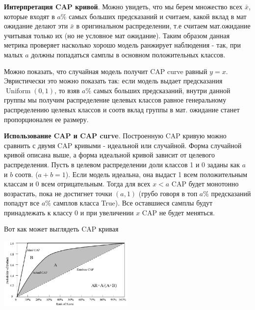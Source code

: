 \documentclass{article}
\begin{document}
    \quad 

    \textbf{Интерпретация CAP кривой}. Можно увидеть, что мы берем множество всех 
    $\bar{x}$, которые входят в $a\%$ самых больших предсказаний
    и считаем, какой вклад в мат ожидание делают эти $\bar{x}$ в оригинальном распределении, т.е считаем мат.ожидание учитывая только их 
    (но не условное мат ожидание). Таким образом данная метрика проверяет насколько хорошо модель ранжирует наблюдения - 
    так, при малых $a$ должны попадаться самплы в основном положительных классов. 

    \quad 

    Можно показать, что случайная модель получит CAP curve равный $y=x$. Эвристически это можно показать так: 
    если модель выдает предсказания $\operatorname{Uniform}(0, 1)$, то взяв $a\%$ самых больших предсказаний, внутри данной 
    группы мы получим распределение целевых классов равное генеральному распределению целевых классов и соотв вклад 
    группы в мат. ожидание станет пропорционален ее размеру. 

    \quad 

    \textbf{Использование CAP и CAP curve}. Построенную CAP кривую можно сравнить с двумя CAP кривыми - 
    идеальной или случайной. Форма случайной кривой описана выше, а форма идеальной кривой зависит от целевого распределения.
    Пусть в целевом распределении доли классов 1 и 0 заданы как $a$ и $b$ соотв. ($a + b = 1$). 
    Если модель идеальна, она выдаст 1 всем положительным классам и 0 всем отрицательным. Тогда для всех $x < a$ 
    CAP будет монотонно возрастать, пока не достигнет точки $(a, 1)$ (грубо говоря в топ $a\%$ предсказаний попадут
    все $a\%$ самплов класса True). Все оставшиеся самплы будут принадлежать к классу 0 и при увеличении $x$ 
    CAP не будет меняться. 

    \quad 

    Вот как может выглядеть CAP кривая

    \begin{center}
        \includegraphics[width=0.5\textwidth]{photos/cap.png}
    \end{center}
\end{document}
